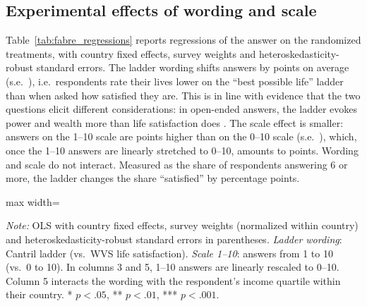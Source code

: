\documentclass[12pt]{article}
\begin{document}
\subsection{Experimental effects of wording and scale}\label{subsec:experiment}

Table~\ref{tab:fabre_regressions} reports regressions of the answer on the randomized treatments, with country fixed effects, survey weights and heteroskedasticity-robust standard errors. The ladder wording shifts answers by \effectLadder points on average (s.e.\ \seLadder), i.e.\ respondents rate their lives lower on the ``best possible life'' ladder than when asked how satisfied they are. This is in line with evidence that the two questions elicit different considerations: in open-ended answers, the ladder evokes power and wealth more than life satisfaction does \citep{nilsson_cantril_2024}. The scale effect is smaller: answers on the 1--10 scale are \effectScale points higher than on the 0--10 scale (s.e.\ \seScale), which, once the 1--10 answers are linearly stretched to 0--10, amounts to \effectScaleZeroTen points. Wording and scale do not interact. Measured as the share of respondents answering 6 or more, the ladder changes the share ``satisfied'' by \effectLadderSatisfied percentage points. %

\begin{table}[htbp]
    \centering
    \caption{Effects of question wording and scale on life evaluation, Fabre (2025) survey experiment.}\label{tab:fabre_regressions}
    \begin{adjustbox}{max width=\textwidth}
    
    \end{adjustbox}
    \begin{minipage}{\textwidth}\footnotesize \textit{Note:} OLS with country fixed effects, survey weights (normalized within country) and heteroskedasticity-robust standard errors in parentheses. \textit{Ladder wording}: Cantril ladder (vs.\ WVS life satisfaction). \textit{Scale 1--10}: answers from 1 to 10 (vs.\ 0 to 10). In columns 3 and 5, 1--10 answers are linearly rescaled to 0--10. Column 5 interacts the wording with the respondent's income quartile within their country. * $p<.05$, ** $p<.01$, *** $p<.001$.\end{minipage}
\end{table}
\end{document}
